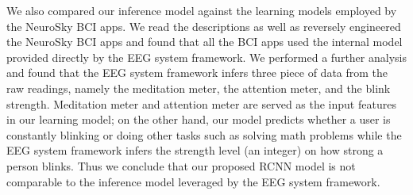 We also compared our inference model against the learning models employed by the NeuroSky BCI apps. We read the descriptions as well as reversely engineered the NeuroSky BCI apps and found that all the BCI apps used the internal model provided directly by the EEG system framework. We performed a further analysis and found that the EEG system framework infers three piece of data from the raw readings, namely the meditation meter, the attention meter, and the blink strength. Meditation meter and attention meter are served as the input features in our learning model; on the other hand, our model predicts whether a user is constantly blinking or doing other tasks such as solving math problems while the EEG system framework infers the strength level (an integer) on how strong a person blinks. %
Thus we conclude that our proposed RCNN model is not comparable to the inference model leveraged by the EEG system  framework.

